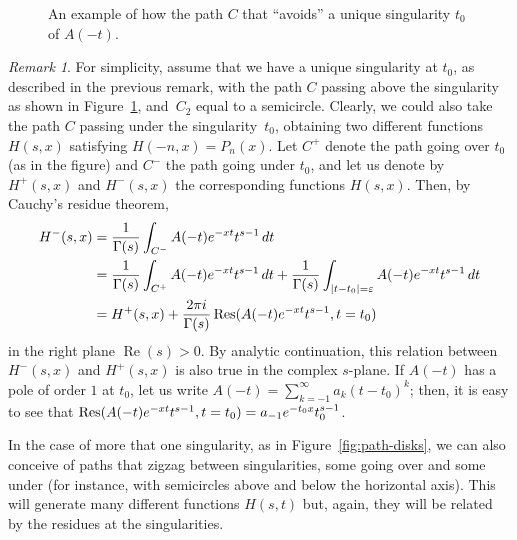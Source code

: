 \documentclass[11pt,a4paper]{amsart}
\newcommand{\eps}{\varepsilon}
\renewcommand{\Re}{\operatorname{Re}}
\newcommand{\Res}{\operatornamewithlimits{Res}}
\theoremstyle{plain}
\theoremstyle{plain}
\theoremstyle{remark}
\newtheorem{remark}{Remark}
\numberwithin{equation}{section}
\begin{document}
\begin{figure}
\caption{An example of how the path $C$ that ``avoids'' a unique singularity $t_0$ of $A(-t)$.}
\label{fig:path-disk}
\end{figure}

\begin{remark}
\label{rem:above-under}
For simplicity, assume that we have a unique singularity at $t_0$, as described in the previous remark, with the path $C$ passing above the singularity as shown in Figure~\ref{fig:path-disk}, and~$C_2$ equal to a semicircle. Clearly, we could also take the path $C$ passing under the singularity~$t_0$, obtaining two different functions $H(s,x)$ satisfying $H(-n,x)=P_n(x)$. Let $C^{+}$ denote the path going over $t_0$ (as in the figure) and $C^{-}$ the path going under $t_0$, and let us denote by $H^{+}(s,x)$ and $H^{-}(s,x)$ the corresponding functions $H(s,x)$. Then, by Cauchy's residue theorem,
\begin{align*}
  H^-(s,x) &= \frac{1}{\Gamma(s)} \int_{C^-} A(-t)e^{-xt} t^{s-1}\,dt \\
  &= \frac{1}{\Gamma(s)} \int_{C^+} A(-t)e^{-xt} t^{s-1}\,dt 
  + \frac{1}{\Gamma(s)} \int_{|t-t_0|=\eps} A(-t)e^{-xt} t^{s-1}\,dt \\
  &= H^+(s,x) + \frac{2\pi i}{\Gamma(s)} \Res(A(-t)e^{-xt} t^{s-1},t=t_0)
\end{align*}
in the right plane $\Re(s) > 0$. By analytic continuation, this relation between $H^-(s,x)$ and $H^+(s,x)$ is also true in the complex $s$-plane. 
If $A(-t)$ has a pole of order $1$ at $t_0$, let us write $A(-t) = \sum_{k=-1}^\infty a_{k} (t-t_0)^k$; 
then, it is easy to see that $\Res(A(-t)e^{-xt} t^{s-1},t=t_0) = a_{-1} e^{-t_0 x}t_0^{s-1}$.

In the case of more that one singularity, as in Figure~\ref{fig:path-disks}, we can also conceive of paths that zigzag between singularities, some going over and some under (for instance, with semicircles above and below the horizontal axis). This will generate many different functions $H(s,t)$ but, again, they will be related by the residues at the singularities.
\end{remark}
\end{document}
